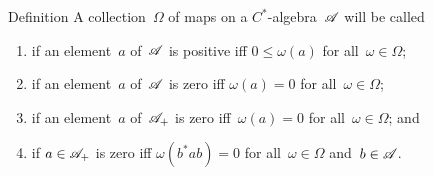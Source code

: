 \documentclass[a]{subfiles}
\begin{document}
\begin{parsec}%
\begin{point}[separating]{Definition}%
A collection~$\Omega$ of maps on a $C^*$-algebra~$\mathscr{A}$
will be called
\begin{enumerate}
\item
{} if an element~$a$ of~$\mathscr{A}$
is positive iff $0\leq \omega(a)$
for all~$\omega\in \Omega$;
\item
{} if an element~$a$ of~$\mathscr{A}$
is zero iff $\omega(a)=0$ for all~$\omega\in\Omega$;
\item
{} if an element~$a$ of~$\mathscr{A}_+$
is zero iff~$\omega(a)=0$ for all~$\omega\in\Omega$; and
\item
{} if $a\in\mathscr{A}_+$
is zero iff $\omega(b^*ab)=0$ for all~$\omega\in\Omega$
and~$b\in \mathscr{A}$.


\end{enumerate}
\end{point}
\end{parsec}
\end{document}
